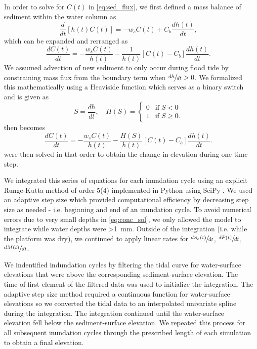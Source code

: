 In order to solve for $C(t)$ in \cref{eq:sed_flux}, we first defined a mass balance of sediment within the water column as
\begin{equation}\label{eq:conc_mass_bal}
	\frac{d}{dt}[h(t)C(t)] = -w_s C(t) + C_b \frac{dh(t)}{dt},
\end{equation}
which can be expanded and rerranged as
\begin{equation}\label{eq:conc_dt}
	\frac{dC(t)}{dt} = - \frac{w_sC(t)}{h(t)} - \frac{1}{h(t)}[C(t) - C_b]\frac{dh(t)}{dt}.
\end{equation}
We assumed advection of new sediment to only occur during flood tide by constraining mass flux from the boundary term when $\sfrac{dh}{dt} > 0$. We formalized this mathematically using a Heaviside function which serves as a binary switch and is given as
\begin{equation}\label{eq:heaviside}
	S = \frac{dh}{dt},\quad	H(S) =
	\begin{cases}
		0 & \text{if $S < 0$}\\
		1 & \text{if $S \geq 0$}.
	\end{cases}
\end{equation}
 then becomes
\begin{equation}\label{eq:conc_sol}
	\frac{dC(t)}{dt} = - \frac{w_s C(t)}{h(t)} - \frac{H(S)}{h(t)} [C(t) - C_b]\frac{dh(t)}{dt}.
\end{equation}
 were then solved in that order to obtain the change in elevation during one time step.

We integrated this series of equations for each inundation cycle using an explicit Runge-Kutta method of order 5(4) \citep{dormandFamilyEmbeddedRungeKutta1980} implemented in Python using SciPy \citep{virtanenSciPyFundamentalAlgorithms2020}. We used an adaptive step size which provided computational efficiency by decreasing step size as needed - i.e. beginning and end of an inundation cycle. To avoid numerical errors due to very small depths in \cref{eq:conc_sol}, we only allowed the model to integrate while water depths were \SI{>1}{\milli\meter}. Outside of the integration (i.e. while the platform was dry), we continued to apply linear rates for $\sfrac{dS_o(t)}{dt}$, $\sfrac{dP(t)}{dt}$, $\sfrac{dM(t)}{dt}$.

We indentified indundation cycles by filtering the tidal curve for water-surface elevations that were above the corresponding sediment-surface elevation. The time of first element of the filtered data was used to initialize the integration. The adaptive step size method required a continuous function for water-surface elevations so we converted the tidal data to an interpolated univariate spline during the integration. The integration continued until the water-surface elevation fell below the sediment-surface elevation. We repeated this process for all subsequent inundation cycles through the prescribed length of each simulation to obtain a final elevation.

